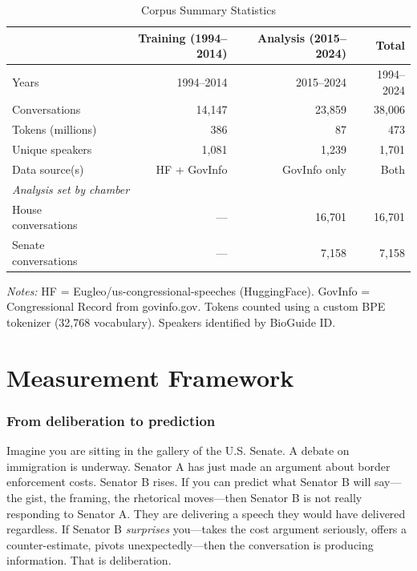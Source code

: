 \documentclass[12pt]{article}
\begin{document}
\begin{table}[H]
\centering
\caption{Corpus Summary Statistics}
\label{tab:corpus}
\begin{threeparttable}
\begin{tabular}{lrrr}
\toprule
& Training (1994--2014) & Analysis (2015--2024) & Total \\
\midrule
Years & 1994--2014 & 2015--2024 & 1994--2024 \\
Conversations & 14,147 & 23,859 & 38,006 \\
Tokens (millions) & 386 & 87 & 473 \\
Unique speakers & 1,081 & 1,239 & 1,701 \\
Data source(s) & HF + GovInfo & GovInfo only & Both \\
\midrule
\multicolumn{4}{l}{\textit{Analysis set by chamber}} \\
\quad House conversations & --- & 16,701 & 16,701 \\
\quad Senate conversations & --- & 7,158 & 7,158 \\
\bottomrule
\end{tabular}
\begin{tablenotes}[flushleft]
\small
\item \textit{Notes:} HF = Eugleo/us-congressional-speeches (HuggingFace). GovInfo = Congressional Record from govinfo.gov. Tokens counted using a custom BPE tokenizer (32,768 vocabulary). Speakers identified by BioGuide ID.
\end{tablenotes}
\end{threeparttable}
\end{table}


\section{Measurement Framework}

\subsubsection*{From deliberation to prediction}
Imagine you are sitting in the gallery of the U.S. Senate. A debate on immigration is underway. Senator A has just made an argument about border enforcement costs. Senator B rises. If you can predict what Senator B will say---the gist, the framing, the rhetorical moves---then Senator B is not really responding to Senator A. They are delivering a speech they would have delivered regardless. If Senator B \textit{surprises} you---takes the cost argument seriously, offers a counter-estimate, pivots unexpectedly---then the conversation is producing information. That is deliberation.
\end{document}
